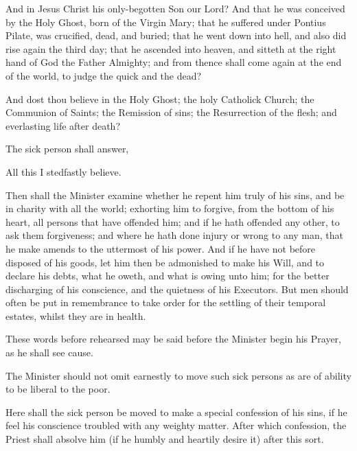 And in Jesus Christ his only-begotten Son our Lord? And that he was conceived by the Holy Ghost, born of the Virgin Mary; that he suffered under Pontius Pilate, was crucified, dead, and buried; that he went down into hell, and also did rise again the third day; that he ascended into heaven, and sitteth at the right hand of God the Father Almighty; and from thence shall come again at the end of the world, to judge the quick and the dead?

And dost thou believe in the Holy Ghost; the holy Catholick Church; the Communion of Saints; the Remission of sins; the Resurrection of the flesh; and everlasting life after death?

\begin{rubric}
The sick person shall answer,
\end{rubric}

All this I stedfastly believe.

\begin{rubric}
Then shall the Minister examine whether he repent him truly of his sins, and be in charity with all the world; exhorting him to forgive, from the bottom of his heart, all persons that have offended him; and if he hath offended any other, to ask them forgiveness; and where he hath done injury or wrong to any man, that he make amends to the uttermost of his power.
And if he have not before disposed of his goods, let him then be admonished to make his Will, and to declare his debts, what he oweth, and what is owing unto him; for the better discharging of his conscience, and the quietness of his Executors.
But men should often be put in remembrance to take order for the settling of their temporal estates, whilst they are in health.
\end{rubric}

\begin{rubric}
These words before rehearsed may be said before the Minister begin his Prayer, as he shall see cause.
\end{rubric}

\begin{rubric}
The Minister should not omit earnestly to move such sick persons as are of ability to be liberal to the poor.
\end{rubric}

\newpage

\begin{rubric}
Here shall the sick person be moved to make a special confession of his sins, if he feel his conscience troubled with any weighty matter.
After which confession, the Priest shall absolve him (if he humbly and heartily desire it) after this sort.
\end{rubric}


